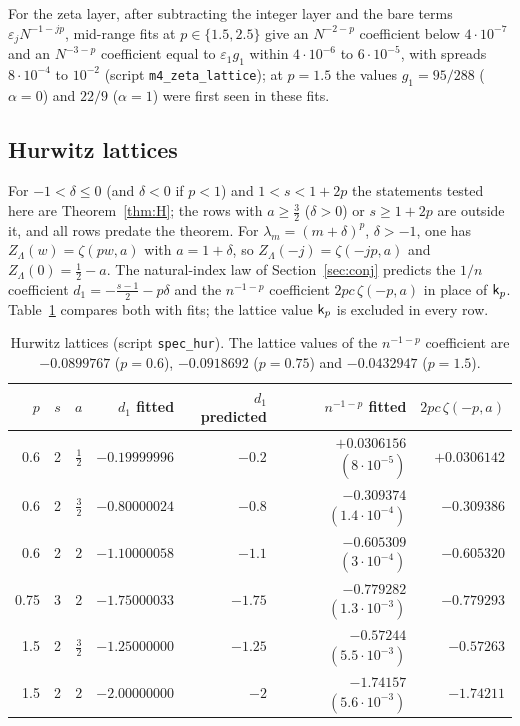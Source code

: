 For the zeta layer, after subtracting the integer layer and the bare terms $\varepsilon_jN^{-1-jp}$, mid-range fits at
$p\in\{1.5,2.5\}$ give an $N^{-2-p}$ coefficient below $4\cdot10^{-7}$ and an $N^{-3-p}$ coefficient equal to $\varepsilon_1g_1$
within $4\cdot10^{-6}$ to $6\cdot10^{-5}$, with spreads $8\cdot10^{-4}$ to $10^{-2}$ (script \texttt{m4\_zeta\_lattice}); at
$p=1.5$ the values $g_1=95/288$ ($\alpha=0$) and $22/9$ ($\alpha=1$) were first seen in these fits.

\subsection{Hurwitz lattices}\label{sec:hurwitz}
For $-1<\delta\le0$ (and $\delta<0$ if $p<1$) and $1<s<1+2p$ the statements tested here are Theorem~\ref{thm:H}; the rows with $a\ge\frac32$
($\delta>0$) or $s\ge1+2p$ are outside it, and all rows predate the theorem.
For $\lambda_m=(m+\delta)^p$, $\delta>-1$, one has $Z_\Lambda(w)=\zeta(pw,a)$ with $a=1+\delta$, so $Z_\Lambda(-j)=\zeta(-jp,a)$ and
$Z_\Lambda(0)=\frac12-a$. The natural-index law of Section~\ref{sec:conj} predicts the $1/n$ coefficient
$d_1=-\frac{s-1}2-p\delta$ and the $n^{-1-p}$ coefficient $2pc\,\zeta(-p,a)$ in place of $\mathsf k_p$. Table~\ref{tab:hurwitz}
compares both with fits; the lattice value $\mathsf k_p$ is excluded in every row.

\begin{table}[ht]
\centering
\small
\begin{tabular}{rrrrrrr}
\toprule
$p$ & $s$ & $a$ & $d_1$ fitted & $d_1$ predicted & $n^{-1-p}$ fitted & $2pc\,\zeta(-p,a)$\\
\midrule
0.6 & 2 & $\frac12$ & $-0.19999996$ & $-0.2$ & $+0.0306156$ $(8\cdot10^{-5})$ & $+0.0306142$\\
0.6 & 2 & $\frac32$ & $-0.80000024$ & $-0.8$ & $-0.309374$ $(1.4\cdot10^{-4})$ & $-0.309386$\\
0.6 & 2 & $2$ & $-1.10000058$ & $-1.1$ & $-0.605309$ $(3\cdot10^{-4})$ & $-0.605320$\\
0.75 & 3 & $2$ & $-1.75000033$ & $-1.75$ & $-0.779282$ $(1.3\cdot10^{-3})$ & $-0.779293$\\
1.5 & 2 & $\frac32$ & $-1.25000000$ & $-1.25$ & $-0.57244$ $(5.5\cdot10^{-3})$ & $-0.57263$\\
1.5 & 2 & $2$ & $-2.00000000$ & $-2$ & $-1.74157$ $(5.6\cdot10^{-3})$ & $-1.74211$\\
\bottomrule
\end{tabular}
\caption{Hurwitz lattices (script \texttt{spec\_hur}). The lattice values of the $n^{-1-p}$ coefficient are $-0.0899767$
($p=0.6$), $-0.0918692$ ($p=0.75$) and $-0.0432947$ ($p=1.5$).}
\label{tab:hurwitz}
\end{table}

